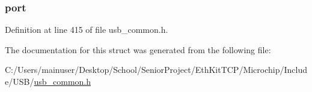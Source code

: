 \subsubsection[{port}]{ port}\label{struct__vbus__power__data_a5e8703ab09ab1691cae59ecf39a7071b}


Definition at line 415 of file usb\+\_\+common.\+h.



The documentation for this struct was generated from the following file\+:\begin{DoxyCompactItemize}
\item 
C\+:/\+Users/mainuser/\+Desktop/\+School/\+Senior\+Project/\+Eth\+Kit\+T\+C\+P/\+Microchip/\+Include/\+U\+S\+B/\hyperlink{usb__common_8h}{usb\+\_\+common.\+h}\end{DoxyCompactItemize}
